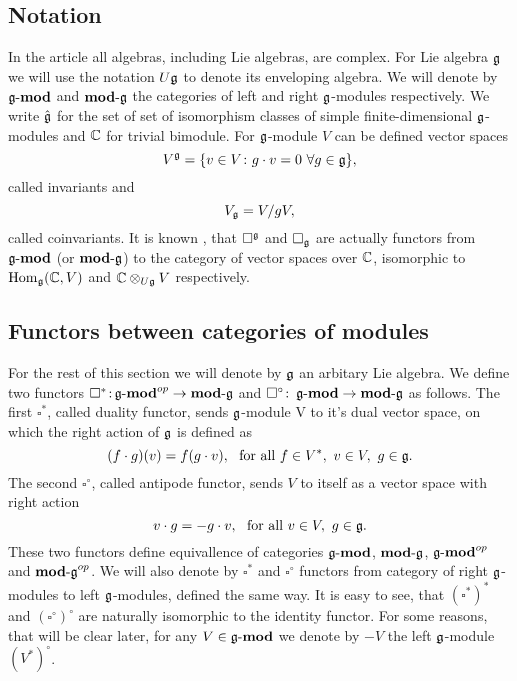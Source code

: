 % 

\subsection{Notation} \todo{$\CC_\lambda$}
In the article all algebras, including Lie algebras, are complex. 
For Lie algebra $\mathfrak{g}$ we will use the notation $U\mathfrak{g}$ to denote its enveloping algebra. We will
denote by $\operatorname{\mathbf{\mathfrak{g}-mod}}$ and $\operatorname{\mathbf{mod-\mathfrak{g}}}$ the categories of left and right $\mathfrak{g}$-modules respectively. 
We write $\hat{\mathfrak{g}}$ for the set of set of isomorphism classes of simple finite-dimensional
$\mathfrak{g}$-modules and $\mathbb{C}$ for trivial bimodule. 
For $\mathfrak{g}$-module $V$ can be defined vector spaces 
\begin{equation}
    V^{\mathfrak{g}} = \{v\in V\colon g\cdot v = 0 ~ \forall g\in \mathfrak{g} \}, 
\end{equation}
called invariants and
\begin{equation}
    V_{\mathfrak{g}} = V/gV,
\end{equation}
called coinvariants. It is known , that $\square^{\mathfrak{g}}$ and $\square_{\mathfrak{g}}$ are actually functors
from $\operatorname{\mathbf{\mathfrak{g}-mod}}$ (or $\operatorname{\mathbf{mod-\mathfrak{g}}}$) to the category of vector spaces over $\mathbb{C}$, isomorphic to
$\operatorname{Hom}_{\mathfrak{g}}(\mathbb{C}, V)$ and $\mathbb{C} \otimes_{U\mathfrak{g}} V$ respectively. 

\subsection{Functors between categories of modules}
For the rest of this section we will denote by $\mathfrak{g}$ an arbitary Lie algebra.
We define two functors $\square^*\colon \\ \operatorname{\mathbf{\mathfrak{g}-mod}}^{op} \to \operatorname{\mathbf{mod-\mathfrak{g}}}$ and $\square^\circ\colon
\operatorname{\mathbf{\mathfrak{g}-mod}} \to \operatorname{\mathbf{mod-\mathfrak{g}}}$ as follows. The first $\square^*$, called duality functor, sends 
$\mathfrak{g}$-module V to it's dual vector space, on which the right action of $\mathfrak{g}$ is defined as 
\[
    (f\cdot g) (v) = f(g\cdot v),~\text{ for all } f\in V^*,~v \in V,~g\in\mathfrak{g}.
\]
The second $\square^\circ$, called antipode functor, sends $V$ to itself as a vector space with right
action
\[\label{test}
    v\cdot g = - g\cdot v,~\text{ for all } v \in V,~g\in\mathfrak{g}.
\]
These two functors define equivallence of categories $\operatorname{\mathbf{\mathfrak{g}-mod}}$, $\operatorname{\mathbf{mod-\mathfrak{g}}}$, $\operatorname{\mathbf{\mathfrak{g}-mod}}^{op}$
and $\operatorname{\mathbf{mod-\mathfrak{g}}}^{op}$. We will also denote by $\square^*$ and $\square^\circ$ functors from
category of right $\mathfrak{g}$-modules to left $\mathfrak{g}$-modules, defined the same way. It is easy to
see, that $(\square^*)^*$ and $(\square^\circ)^\circ$ are naturally isomorphic to the identity functor.
For some reasons, that will be clear later, for any $V\in \operatorname{\mathbf{\mathfrak{g}-mod}}$ we denote by $-V$ the left
$\mathfrak{g}$-module $(V^*)^\circ$.

